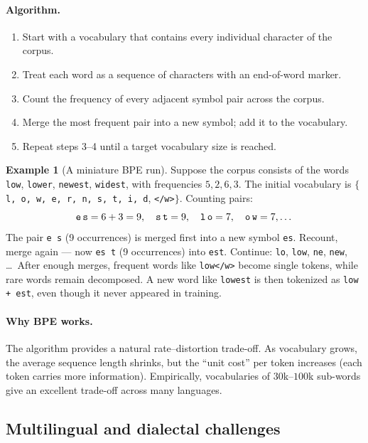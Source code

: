 \documentclass[12pt,a4paper]{report}
\theoremstyle{definition}
\newtheorem{example}{Example}[section]
\theoremstyle{remark}
\begin{document}
\paragraph{Algorithm.}
\begin{enumerate}
    \item Start with a vocabulary that contains every individual character of the corpus.
    \item Treat each word as a sequence of characters with an end-of-word marker.
    \item Count the frequency of every adjacent symbol pair across the corpus.
    \item Merge the most frequent pair into a new symbol; add it to the vocabulary.
    \item Repeat steps 3--4 until a target vocabulary size is reached.
\end{enumerate}

\begin{example}[A miniature BPE run]
Suppose the corpus consists of the words \texttt{low}, \texttt{lower}, \texttt{newest}, \texttt{widest}, with frequencies $5, 2, 6, 3$. The initial vocabulary is $\{$\texttt{l, o, w, e, r, n, s, t, i, d}, \texttt{</w>}$\}$. Counting pairs:
\[ \texttt{e\,s} = 6 + 3 = 9,\quad \texttt{s\,t} = 9,\quad \texttt{l\,o} = 7, \quad \texttt{o\,w} = 7, \dots \]
The pair \texttt{e\,s} (9 occurrences) is merged first into a new symbol \texttt{es}. Recount, merge again --- now \texttt{es\,t} (9 occurrences) into \texttt{est}. Continue: \texttt{lo}, \texttt{low}, \texttt{ne}, \texttt{new}, \dots\ After enough merges, frequent words like \texttt{low</w>} become single tokens, while rare words remain decomposed. A new word like \texttt{lowest} is then tokenized as \texttt{low + est}, even though it never appeared in training.
\end{example}

\paragraph{Why BPE works.} The algorithm provides a natural rate--distortion trade-off. As vocabulary grows, the average sequence length shrinks, but the ``unit cost'' per token increases (each token carries more information). Empirically, vocabularies of $30$k--$100$k sub-words give an excellent trade-off across many languages.

\subsection{Multilingual and dialectal challenges}
\end{document}
